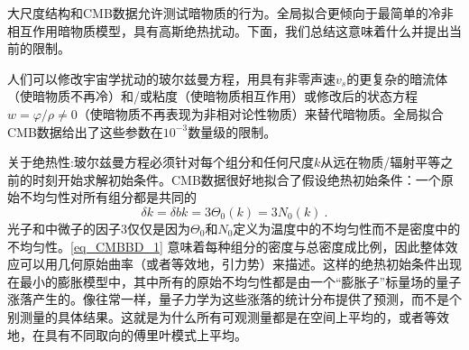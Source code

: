 
大尺度结构和CMB数据允许测试暗物质的行为。全局拟合更倾向于最简单的冷非相互作用暗物质模型，具有高斯绝热扰动。下面，我们总结这意味着什么并提出当前的限制。

人们可以修改宇宙学扰动的玻尔兹曼方程，用具有非零声速$v_s$的更复杂的暗流体（使暗物质不再冷）和/或粘度（使暗物质相互作用）或修改后的状态方程$w = \varphi/\rho \neq 0$（使暗物质不再表现为非相对论性物质）来替代暗物质。全局拟合CMB数据给出了这些参数在$10^{-3}$数量级的限制。

关于绝热性:玻尔兹曼方程必须针对每个组分和任何尺度$k$从远在物质/辐射平等之前的时刻开始求解初始条件。CMB数据很好地拟合了假设绝热初始条件：一个原始不均匀性对所有组分都是共同的
\begin{equation}\label{eq_CMBBD_1}
\delta k = \delta bk = 3\Theta_0(k) = 3N_0(k)~.
\end{equation}
光子和中微子的因子$3$仅仅是因为$\Theta_0$和$N_0$定义为温度中的不均匀性而不是密度中的不均匀性。\autoref{eq_CMBBD_1} 意味着每种组分的密度与总密度成比例，因此整体效应可以用几何原始曲率（或者等效地，引力势）来描述。这样的绝热初始条件出现在最小的膨胀模型中，其中所有的原始不均匀性都是由一个“膨胀子”标量场的量子涨落产生的。像往常一样，量子力学为这些涨落的统计分布提供了预测，而不是个别测量的具体结果。这就是为什么所有可观测量都是在空间上平均的，或者等效地，在具有不同取向的傅里叶模式上平均。

